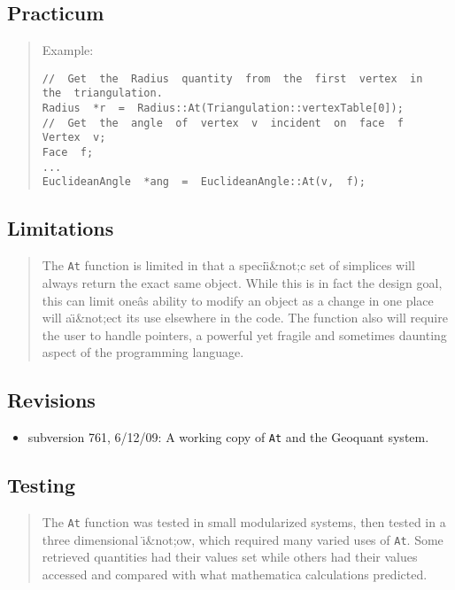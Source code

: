 \documentclass[10pt]{article}%
\begin{document}
\subsection*{Practicum}

\begin{quotation} Example:{\small{\begin{verbatim} 
//  Get  the  Radius  quantity  from  the  first  vertex  in  the  triangulation.
Radius  *r  =  Radius::At(Triangulation::vertexTable[0]);
//  Get  the  angle  of  vertex  v  incident  on  face  f
Vertex  v;
Face  f;
...
EuclideanAngle  *ang  =  EuclideanAngle::At(v,  f);
  \end{verbatim}
}}
\end{quotation}
\subsection*{Limitations}

\begin{quotation} The \texttt{At} function is limited in that a speci\"{\i}\&not;c set of simplices will always return the exact same object.  While this is in fact the design goal, this can limit one\^as ability to modify an object as a change in one place will a\"{\i}\&not;ect its use elsewhere in the code. The function also will require the user to handle pointers, a powerful yet fragile and sometimes daunting aspect of the programming language.\end{quotation}

\subsection*{Revisions}

\begin{itemize}\item  subversion 761, 6/12/09: A working copy of \texttt{At} and the Geoquant system.
\end{itemize}

\subsection*{Testing}

\begin{quotation} The \texttt{At} function was tested in small modularized systems, then tested in a three dimensional \"{\i}\&not;ow, which required many varied uses of \texttt{At}.   Some retrieved quantities had their values set while others had their values accessed and compared with what mathematica calculations predicted.\end{quotation}
\end{document}
